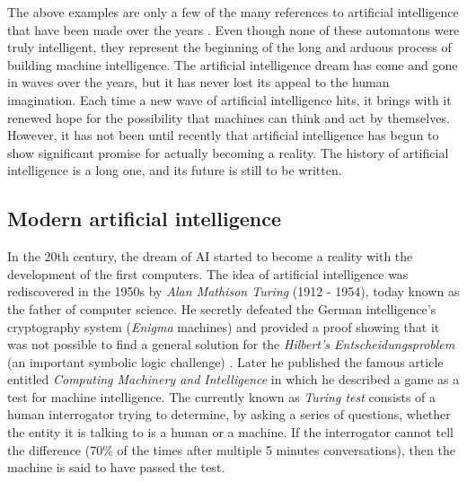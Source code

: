 The above examples are only a few of the many references to artificial intelligence that have been made over the years \autocite{nils2009}. Even though none of these automatons were truly intelligent, they represent the beginning of the long and arduous process of building machine intelligence.  The artificial intelligence dream has come and gone in waves over the years, but it has never lost its appeal to the human imagination. Each time a new wave of artificial intelligence hits, it brings with it renewed hope for the possibility that machines can think and act by themselves. However, it has not been until recently that artificial intelligence has begun to show significant promise for actually becoming a reality. The history of artificial intelligence is a long one, and its future is still to be written.

\subsection{Modern artificial intelligence}
In the 20th century, the dream of AI started to become a reality with the development of the first computers. The idea of artificial intelligence was rediscovered in the 1950s by \textit{Alan Mathison Turing} (1912 - 1954), today known as the father of computer science. He secretly defeated the German intelligence's cryptography system (\textit{Enigma} machines) \autocite{Hodges:2000} and provided a proof showing that it was not possible to find a general solution for the \textit{Hilbert's Entscheidungsproblem} (an important symbolic logic challenge) \autocite{turing1936}. Later he published the famous article entitled \textit{Computing Machinery and Intelligence} \autocite{turing1950} in which he described a game as a test for machine intelligence. The currently known as \textit{Turing test} consists of a human interrogator trying to determine, by asking a series of questions, whether the entity it is talking to is a human or a machine. If the interrogator cannot tell the difference (70\% of the times after multiple 5 minutes conversations), then the machine is said to have passed the test.

